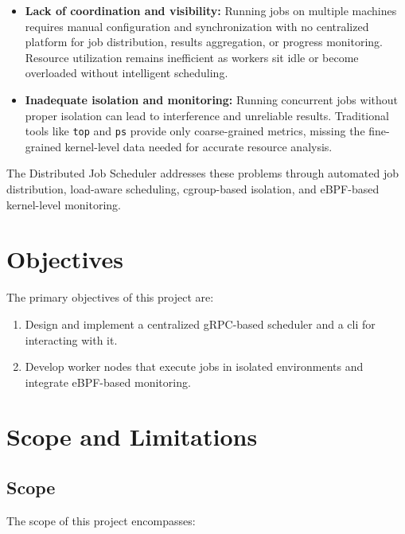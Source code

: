 \begin{itemize}
    \item \textbf{Lack of coordination and visibility:} Running jobs on multiple machines requires manual configuration and synchronization with no centralized platform for job distribution, results aggregation, or progress monitoring. Resource utilization remains inefficient as workers sit idle or become overloaded without intelligent scheduling.
    \item \textbf{Inadequate isolation and monitoring:} Running concurrent jobs without proper isolation can lead to interference and unreliable results. Traditional tools like \texttt{top} and \texttt{ps} provide only coarse-grained metrics, missing the fine-grained kernel-level data needed for accurate resource analysis.
\end{itemize}

The Distributed Job Scheduler addresses these problems through automated job distribution, load-aware scheduling, cgroup-based isolation, and eBPF-based kernel-level monitoring.

\section{Objectives}

The primary objectives of this project are:

\begin{enumerate}
    \item Design and implement a centralized gRPC-based scheduler and a cli for interacting with it.
    \item Develop worker nodes that execute jobs in isolated environments and integrate eBPF-based monitoring.
\end{enumerate}

\section{Scope and Limitations}

\subsection{Scope}

The scope of this project encompasses:

